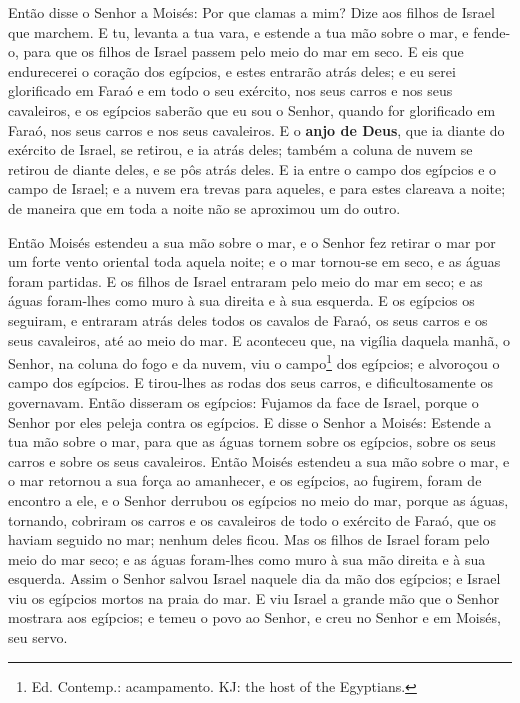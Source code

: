 Então disse o Senhor a Moisés: Por que clamas a mim? Dize aos
filhos de Israel que marchem. E tu, levanta a tua vara, e
estende a tua mão sobre o mar, e fende-o, para que os filhos de
Israel passem pelo meio do mar em seco. E eis que endurecerei
o coração dos egípcios, e estes entrarão atrás deles; e eu serei
glorificado em Faraó e em todo o seu exército, nos seus carros e nos
seus cavaleiros, e os egípcios saberão que eu sou o Senhor,
quando for glorificado em Faraó, nos seus carros e nos seus
cavaleiros. E o \textbf{anjo de Deus}, que ia diante do
exército de Israel, se retirou, e ia atrás deles; também a coluna de
nuvem se retirou de diante deles, e se pôs atrás deles. E ia
entre o campo dos egípcios e o campo de Israel; e a nuvem era trevas
para aqueles, e para estes clareava a noite; de maneira que em toda
a noite não se aproximou um do outro.

Então Moisés estendeu a sua mão sobre o mar, e o Senhor fez
retirar o mar por um forte vento oriental toda aquela noite; e o mar
tornou-se em seco, e as águas foram partidas. E os filhos de
Israel entraram pelo meio do mar em seco; e as águas foram-lhes como
muro à sua direita e à sua esquerda. E os egípcios os
seguiram, e entraram atrás deles todos os cavalos de Faraó, os seus
carros e os seus cavaleiros, até ao meio do mar. E aconteceu
que, na vigília daquela manhã, o Senhor, na coluna do fogo e da
nuvem, viu o campo\footnote{Ed. Contemp.: acampamento. KJ: the host
of the Egyptians.} dos egípcios; e alvoroçou o campo dos egípcios.
E tirou-lhes as rodas dos seus carros, e dificultosamente os
governavam. Então disseram os egípcios: Fujamos da face de Israel,
porque o Senhor por eles peleja contra os egípcios. E disse o
Senhor a Moisés: Estende a tua mão sobre o mar, para que as águas
tornem sobre os egípcios, sobre os seus carros e sobre os seus
cavaleiros. Então Moisés estendeu a sua mão sobre o mar, e o
mar retornou a sua força ao amanhecer, e os egípcios, ao fugirem,
foram de encontro a ele, e o Senhor derrubou os egípcios no meio do
mar, porque as águas, tornando, cobriram os carros e os
cavaleiros de todo o exército de Faraó, que os haviam seguido no
mar; nenhum deles ficou. Mas os filhos de Israel foram pelo
meio do mar seco; e as águas foram-lhes como muro à sua mão direita
e à sua esquerda. Assim o Senhor salvou Israel naquele dia da
mão dos egípcios; e Israel viu os egípcios mortos na praia do mar.
E viu Israel a grande mão que o Senhor mostrara aos egípcios;
e temeu o povo ao Senhor, e creu no Senhor e em Moisés, seu servo.

